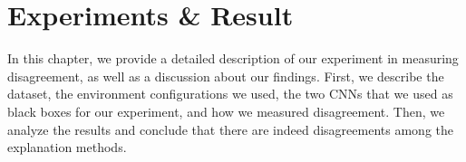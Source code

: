 \chapter{Experiments \& Result}
\label{ch:experimentsAndResult}
In this chapter, we provide a detailed description of our experiment in measuring disagreement, as well as a discussion about our findings. First, we describe the dataset, the environment configurations we used, the two CNNs that we used as black boxes for our experiment, and how we measured disagreement. Then, we analyze the results and conclude that there are indeed disagreements among the explanation methods.


